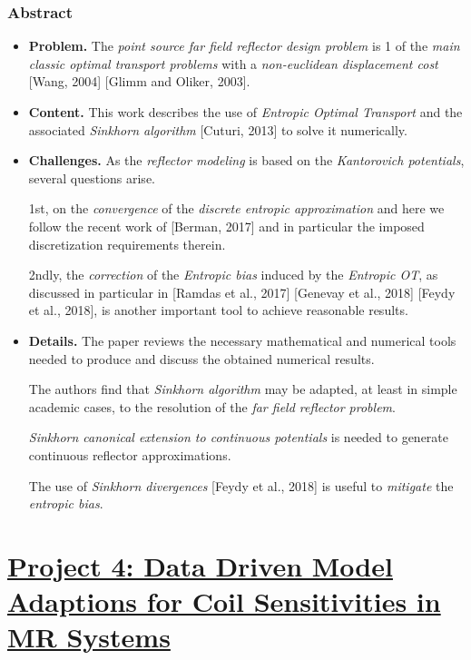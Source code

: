 \documentclass{book}
\numberwithin{equation}{section}
\begin{document}
\subsection*{Abstract}
\begin{itemize}
    \item \textbf{Problem.} The \textit{point source far field reflector design problem} is 1 of the \textit{main classic optimal transport problems} with a \textit{non-euclidean displacement cost} [Wang, 2004] [Glimm and Oliker, 2003].
    \item \textbf{Content.} This work describes the use of \textit{Entropic Optimal Transport} and the associated \textit{Sinkhorn algorithm} [Cuturi, 2013] to solve it numerically.
    \item \textbf{Challenges.} As the \textit{reflector modeling} is based on the \textit{Kantorovich potentials}, several questions arise. 
    
    1st, on the \textit{convergence} of the \textit{discrete entropic approximation} and here we follow the recent work of [Berman, 2017] and in particular the imposed discretization requirements therein.
    
    2ndly, the \textit{correction} of the \textit{Entropic bias} induced by the \textit{Entropic OT}, as discussed in particular in [Ramdas et al., 2017] [Genevay et al., 2018] [Feydy et al., 2018], is another important tool to achieve reasonable results.
    \item \textbf{Details.} The paper reviews the necessary mathematical and numerical tools needed to produce and discuss the obtained numerical results.
    
    The authors find that \textit{Sinkhorn algorithm} may be adapted, at least in simple academic cases, to the resolution of the \textit{far field reflector problem}.
    
    \textit{Sinkhorn canonical extension to continuous potentials} is needed to generate continuous reflector approximations.
    
    The use of \textit{Sinkhorn divergences} [Feydy et al., 2018] is useful to \textit{mitigate} the \textit{entropic bias}.
\end{itemize}


\chapter{\href{https://www.romsoc.eu/data-driven-model-adaptions-for-coil-sensitivities-in-mr-systems/}{Project 4: Data Driven Model Adaptions for Coil Sensitivities in MR Systems}}
\end{document}
